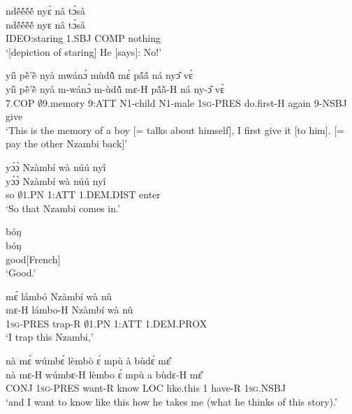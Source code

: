 \begin{exe} 
\exN\label{105}
  \glll ndẽ́ẽ́ẽ́ẽ́ nyɛ̀ nâ tɔ̀sâ \\
       ndẽ́ẽ́ẽ́ẽ́ nyɛ nâ tɔ̀sâ \\
      IDEO:staring 1.SBJ COMP nothing   \\
    \trans `[depiction of staring] He [says]: No!'
\end{exe}

\begin{exe} 
\exN\label{106}
  \glll yíì pẽ̀'ẽ̀ nyà mwánɔ̀ mùdũ̂ mɛ́ pã́ã́ ná nyɔ̂ vɛ̀ \\
       yíì pẽ̀'ẽ̀ nyà m-wánɔ̀ m-ùdũ̂ mɛ-H pã́ã̀-H ná ny-ɔ̂ vɛ̀ \\
      7.COP $\emptyset$9.memory 9:ATT N1-child N1-male  1\textsc{sg}-PRES do.first-H again 9-NSBJ give  \\
    \trans `This is the memory of a boy [= talks about himself], I first give it [to him]. [= pay the other Nzambi back]'
\end{exe}

\begin{exe} 
\exN\label{107}
  \glll yɔ́ɔ̀ Nzàmbí wà núú nyî \\
       yɔ́ɔ̀ Nzàmbí wà núú nyî \\
        so $\emptyset$1.PN 1:ATT 1.DEM.DIST enter \\
    \trans `So that Nzambi comes in.'
\end{exe}

\begin{exe} 
\exN\label{108}
  \glll bóŋ \\
        bóŋ \\
        good[French] \\
    \trans `Good.'
\end{exe}

\begin{exe} 
\exN\label{109}
  \glll mɛ́ lámbó Nzàmbí wà nû \\
       mɛ-H lámbo-H Nzàmbí wà nû \\
        1\textsc{sg}-PRES trap-R $\emptyset$1.PN 1:ATT 1.DEM.PROX \\
    \trans `I trap this Nzambi,'
\end{exe}

\begin{exe} 
\exN\label{110} 
  \glll nà mɛ́ wúmbɛ́ lèmbò ɛ́ mpù à bùdɛ́ mɛ̂ \\
          nà mɛ-H wúmbɛ-H lèmbo ɛ́ mpù a bùdɛ-H mɛ̂ \\
       CONJ 1\textsc{sg}-PRES want-R know LOC like.this 1 have-R 1\textsc{sg}.NSBJ  \\
    \trans `and I want to know like this how he takes me (what he thinks of this story).'
\end{exe}

